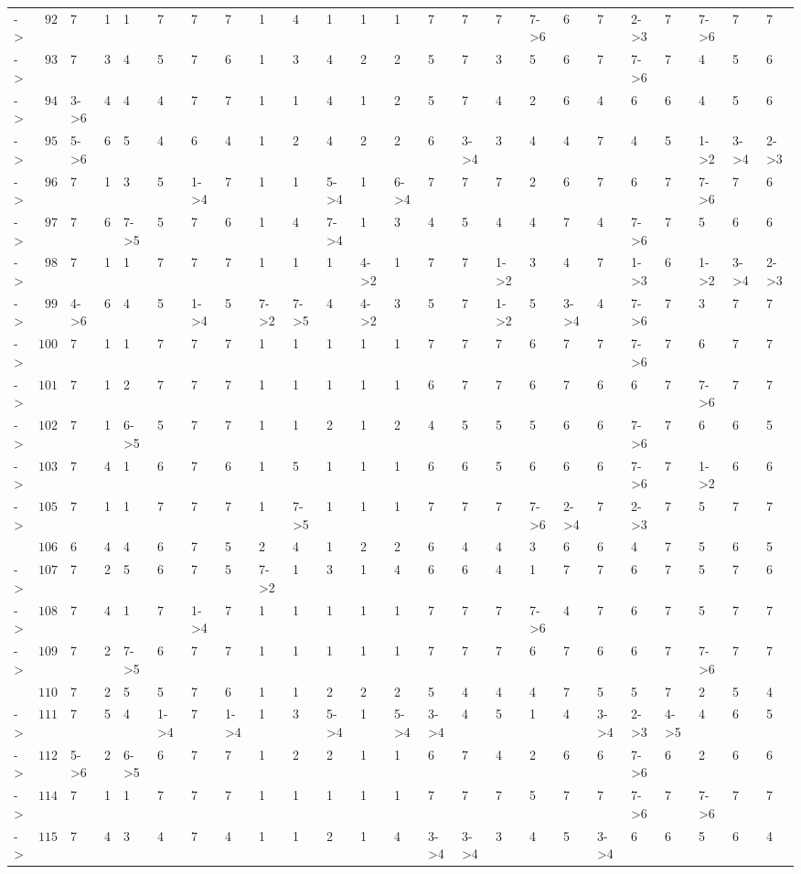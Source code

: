 \documentclass[6pt]{article}
\begin{document}
\begin{landscape}
{\begin{longtable}{lrllllllllllllllllllllll}
\newpage
-\textgreater &$ 92$&7&1&1&7&7&7&1&4&1&1&1&7&7&7&7-\textgreater 6&6&7&2-\textgreater 3&7&7-\textgreater 6&7&7\tabularnewline
-\textgreater &$ 93$&7&3&4&5&7&6&1&3&4&2&2&5&7&3&5&6&7&7-\textgreater 6&7&4&5&6\tabularnewline
-\textgreater &$ 94$&3-\textgreater 6&4&4&4&7&7&1&1&4&1&2&5&7&4&2&6&4&6&6&4&5&6\tabularnewline
-\textgreater &$ 95$&5-\textgreater 6&6&5&4&6&4&1&2&4&2&2&6&3-\textgreater 4&3&4&4&7&4&5&1-\textgreater 2&3-\textgreater 4&2-\textgreater 3\tabularnewline
-\textgreater &$ 96$&7&1&3&5&1-\textgreater 4&7&1&1&5-\textgreater 4&1&6-\textgreater 4&7&7&7&2&6&7&6&7&7-\textgreater 6&7&6\tabularnewline
-\textgreater &$ 97$&7&6&7-\textgreater 5&5&7&6&1&4&7-\textgreater 4&1&3&4&5&4&4&7&4&7-\textgreater 6&7&5&6&6\tabularnewline
-\textgreater &$ 98$&7&1&1&7&7&7&1&1&1&4-\textgreater 2&1&7&7&1-\textgreater 2&3&4&7&1-\textgreater 3&6&1-\textgreater 2&3-\textgreater 4&2-\textgreater 3\tabularnewline
-\textgreater &$ 99$&4-\textgreater 6&6&4&5&1-\textgreater 4&5&7-\textgreater 2&7-\textgreater 5&4&4-\textgreater 2&3&5&7&1-\textgreater 2&5&3-\textgreater 4&4&7-\textgreater 6&7&3&7&7\tabularnewline
-\textgreater &$100$&7&1&1&7&7&7&1&1&1&1&1&7&7&7&6&7&7&7-\textgreater 6&7&6&7&7\tabularnewline
-\textgreater &$101$&7&1&2&7&7&7&1&1&1&1&1&6&7&7&6&7&6&6&7&7-\textgreater 6&7&7\tabularnewline
-\textgreater &$102$&7&1&6-\textgreater 5&5&7&7&1&1&2&1&2&4&5&5&5&6&6&7-\textgreater 6&7&6&6&5\tabularnewline
-\textgreater &$103$&7&4&1&6&7&6&1&5&1&1&1&6&6&5&6&6&6&7-\textgreater 6&7&1-\textgreater 2&6&6\tabularnewline
-\textgreater &$105$&7&1&1&7&7&7&1&7-\textgreater 5&1&1&1&7&7&7&7-\textgreater 6&2-\textgreater 4&7&2-\textgreater 3&7&5&7&7\tabularnewline
&$106$&6&4&4&6&7&5&2&4&1&2&2&6&4&4&3&6&6&4&7&5&6&5\tabularnewline
-\textgreater &$107$&7&2&5&6&7&5&7-\textgreater 2&1&3&1&4&6&6&4&1&7&7&6&7&5&7&6\tabularnewline
-\textgreater &$108$&7&4&1&7&1-\textgreater 4&7&1&1&1&1&1&7&7&7&7-\textgreater 6&4&7&6&7&5&7&7\tabularnewline
-\textgreater &$109$&7&2&7-\textgreater 5&6&7&7&1&1&1&1&1&7&7&7&6&7&6&6&7&7-\textgreater 6&7&7\tabularnewline
&$110$&7&2&5&5&7&6&1&1&2&2&2&5&4&4&4&7&5&5&7&2&5&4\tabularnewline
-\textgreater &$111$&7&5&4&1-\textgreater 4&7&1-\textgreater 4&1&3&5-\textgreater 4&1&5-\textgreater 4&3-\textgreater 4&4&5&1&4&3-\textgreater 4&2-\textgreater 3&4-\textgreater 5&4&6&5\tabularnewline
-\textgreater &$112$&5-\textgreater 6&2&6-\textgreater 5&6&7&7&1&2&2&1&1&6&7&4&2&6&6&7-\textgreater 6&6&2&6&6\tabularnewline
-\textgreater &$114$&7&1&1&7&7&7&1&1&1&1&1&7&7&7&5&7&7&7-\textgreater 6&7&7-\textgreater 6&7&7\tabularnewline
-\textgreater &$115$&7&4&3&4&7&4&1&1&2&1&4&3-\textgreater 4&3-\textgreater 4&3&4&5&3-\textgreater 4&6&6&5&6&4\tabularnewline

\end{longtable}}
\end{landscape}
\end{document}
